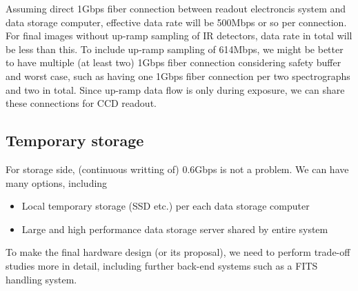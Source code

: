 \documentclass[a4paper,notitlepage]{article}
\begin{document}
Assuming direct 1Gbps fiber connection between readout electroncis system 
and data storage computer, effective data rate will be 500Mbps or so per 
connection. 
For final images without up-ramp sampling of IR detectors, 
data rate in total will be less than this. 
To include up-ramp sampling of 614Mbps, 
we might be better to have multiple (at least two) 1Gbps fiber connection 
considering safety buffer and worst case, such as having one 1Gbps fiber 
connection per two spectrographs and two in total. 
Since up-ramp data flow is only during exposure, we can share these connections 
for CCD readout. 


\subsection{Temporary storage}

For storage side, (continuous writting of) 0.6Gbps is not a problem. 
We can have many options, including

\begin{itemize}
  \item Local temporary storage (SSD etc.) per each data storage computer
  \item Large and high performance data storage server shared by entire system
\end{itemize}

To make the final hardware design (or its proposal), 
we need to perform trade-off studies more in detail, including further back-end 
systems such as a FITS handling system. 
\end{document}
